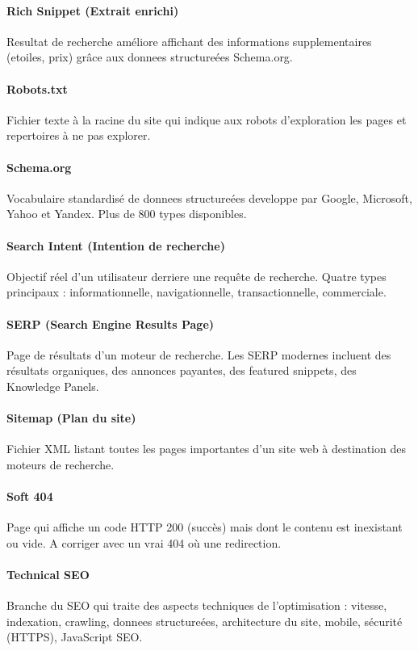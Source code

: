 \paragraph*{Rich Snippet (Extrait enrichi)}
Resultat de recherche améliore affichant des informations supplementaires (etoiles, prix) grâce aux donnees structureées Schema.org.

\paragraph*{Robots.txt}
Fichier texte à la racine du site qui indique aux robots d'exploration les pages et repertoires à ne pas explorer.

\paragraph*{Schema.org}
Vocabulaire standardisé de donnees structureées developpe par Google, Microsoft, Yahoo et Yandex. Plus de 800 types disponibles.

\paragraph*{Search Intent (Intention de recherche)}
Objectif réel d'un utilisateur derriere une requête de recherche. Quatre types principaux : informationnelle, navigationnelle, transactionnelle, commerciale.

\paragraph*{SERP (Search Engine Results Page)}
Page de résultats d'un moteur de recherche. Les SERP modernes incluent des résultats organiques, des annonces payantes, des featured snippets, des Knowledge Panels.

\paragraph*{Sitemap (Plan du site)}
Fichier XML listant toutes les pages importantes d'un site web à destination des moteurs de recherche.

\paragraph*{Soft 404}
Page qui affiche un code HTTP 200 (succès) mais dont le contenu est inexistant ou vide. A corriger avec un vrai 404 où une redirection.

\paragraph*{Technical SEO}
Branche du SEO qui traite des aspects techniques de l'optimisation : vitesse, indexation, crawling, donnees structureées, architecture du site, mobile, sécurité (HTTPS), JavaScript SEO.

